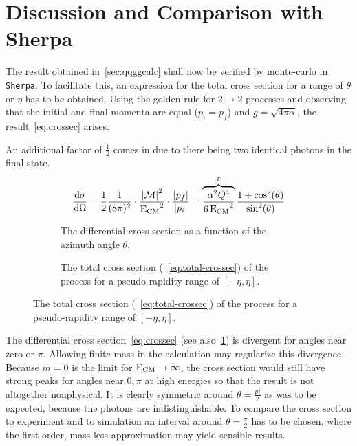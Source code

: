 \section{Discussion and Comparison with Sherpa}%
\label{sec:compsher}

The result obtained in~\ref{sec:qqggcalc} shall now be verified by
monte-carlo in \verb|Sherpa|. To facilitate this, an expression for
the total cross section for a range of \(\theta\) or \(\eta\) has to
be obtained. Using the golden rule for \(2\rightarrow 2\) processes
and observing that the initial and final momenta are equal
(\(p_i=p_f\)) and \(g=\sqrt{4\pi\alpha}\), the
result~\eqref{eq:crossec} arises.

An additional factor of \(\frac{1}{2}\) comes in due to there being
two identical photons in the final state.
\begin{equation}
  \label{eq:crossec}
  \dv{\sigma}{\Omega} =
  \frac{1}{2}\frac{1}{(8\pi)^2}\cdot\frac{\abs{\mathcal{M}}^2}{\operatorname{E_{\text{CM}}}^2}\cdot\frac{\abs{p_f}}{\abs{p_i}}
  = \overbrace{\frac{\alpha^2Q^4}{6\operatorname{E_{\text{CM}}}^2}}^{\mathfrak{C}}\frac{1+\cos^2(\theta)}{\sin^2(\theta)}
\end{equation}


\begin{figure}[ht]
  \centering
  \begin{subfigure}[c]{.45\textwidth}
    \centering {}
    \caption[Plot of the differential cross section of the \(\qqgg\)
    process.]{\label{fig:diffxs} The differential cross section as a
      function of the azimuth angle \(\theta\). }
  \end{subfigure}
  \begin{subfigure}[c]{.45\textwidth}
  \centering
  \caption[Plot of the total cross section of the \(\qqgg\)
  process.]{\label{fig:totxs} The total cross section
    (~\ref{eq:total-crossec}) of the process for a pseudo-rapidity
    range of \([-\eta, \eta]\).}
  \end{subfigure}
\end{figure}

The differential cross section~\eqref{eq:crossec} (see
also~\ref{fig:diffxs}) is divergent for angles near zero or
\(\pi\). Allowing finite mass in the calculation may regularize this
divergence. Because \(m=0\) is the limit for
\(\operatorname{E_{\text{CM}}}\rightarrow\infty\), the cross section would still have strong
peaks for angles near \(0,\pi\) at high energies so that the result is
not altogether nonphysical. It is clearly symmetric around
\(\theta=\frac{pi}{2}\) as was to be expected, because the photons are
indistinguishable. To compare the cross section to experiment and to
simulation an interval around \(\theta=\frac{\pi}{2}\) has to be
chosen, where the first order, mass-less approximation may yield
sensible results.

